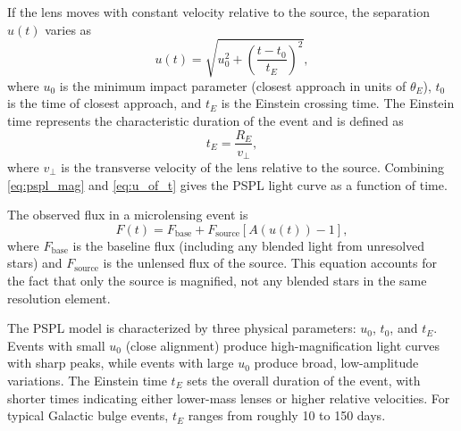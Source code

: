 If the lens moves with constant velocity relative to the source, the separation $u(t)$ varies as
\begin{equation}
  u(t) = \sqrt{u_0^2 + \left(\frac{t - t_0}{t_E}\right)^2},
  \label{eq:u_of_t}
\end{equation}
where $u_0$ is the minimum impact parameter (closest approach in units of $\theta_E$), $t_0$ is the time of closest approach, and $t_E$ is the Einstein crossing time. The Einstein time represents the characteristic duration of the event and is defined as
\begin{equation}
  t_E = \frac{R_E}{v_\perp},
  \label{eq:einstein_time}
\end{equation}
where $v_\perp$ is the transverse velocity of the lens relative to the source. Combining \cref{eq:pspl_mag} and \cref{eq:u_of_t} gives the PSPL light curve as a function of time.

The observed flux in a microlensing event is
\begin{equation}
  F(t) = F_{\mathrm{base}} + F_{\mathrm{source}} \left[A(u(t)) - 1\right],
  \label{eq:flux}
\end{equation}
where $F_{\mathrm{base}}$ is the baseline flux (including any blended light from unresolved stars) and $F_{\mathrm{source}}$ is the unlensed flux of the source. This equation accounts for the fact that only the source is magnified, not any blended stars in the same resolution element.

The PSPL model is characterized by three physical parameters: $u_0$, $t_0$, and $t_E$. Events with small $u_0$ (close alignment) produce high-magnification light curves with sharp peaks, while events with large $u_0$ produce broad, low-amplitude variations. The Einstein time $t_E$ sets the overall duration of the event, with shorter times indicating either lower-mass lenses or higher relative velocities. For typical Galactic bulge events, $t_E$ ranges from roughly 10 to 150 days.

